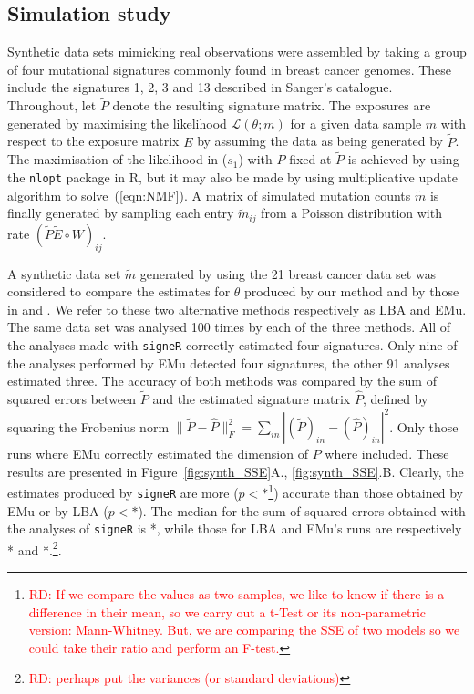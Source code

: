 \documentclass{bioinfo}
\begin{document}
\subsection{Simulation study}
Synthetic data sets mimicking real observations were assembled by
taking a group of four mutational signatures commonly found in breast
cancer genomes. These include the signatures 1, 2, 3 and 13 described
in Sanger's catalogue. Throughout, let $\widetilde P$ denote the
resulting signature matrix.  The exposures are generated by maximising
the likelihood $\mathcal L(\theta; m)$ for a given data sample $m$
with respect to the exposure matrix $E$ by assuming the data as being
generated by $\widetilde P$. The maximisation of the likelihood in
($s_1$) with $P$ fixed at $\widetilde P$ is achieved by using the
\texttt{nlopt} package in R, but it may also be made by using
\cite{LS} multiplicative update algorithm to solve~(\ref{eqn:NMF}). A
matrix of simulated mutation counts $\widetilde m$ is finally
generated by sampling each entry $\widetilde m_{ij}$ from a Poisson
distribution with rate $(\widetilde P\widetilde E\circ W)_{ij}$.

A synthetic data set $\widetilde m$ generated by using the 21 breast
cancer data set was considered to compare the estimates for $\theta$
produced by our method and by those in \cite{A} and \cite{FICMV}. We
refer to these two alternative methods respectively as LBA and EMu.
The same data set was analysed 100 times by each of the three
methods. All of the analyses made with \texttt{signeR} correctly
estimated four signatures. Only nine of the analyses performed by EMu
detected four signatures, the other 91 analyses estimated three.  The
accuracy of both methods was compared by the sum of squared errors
between $\widetilde P$ and the estimated signature matrix $\widehat
P$, defined by squaring the Frobenius norm $\|\widetilde P - \widehat
P\|_F^2 = \sum_{in} |(\widetilde P)_{in} - (\widehat
P)_{in}|^2$. Only those runs where EMu correctly estimated the
dimension of $P$ where included. These results are presented in
Figure~\ref{fig:synth_SSE}A., \ref{fig:synth_SSE}.B. Clearly, the  estimates produced by
\texttt{signeR} are more ($p<*$\footnote{\textcolor{red}{RD: If we
    compare the values as two samples, we like to know if there is a
    difference in their mean, so we carry out a t-Test or its
    non-parametric version: Mann-Whitney. But, we are comparing
    the SSE of two models so we could take their ratio and perform an
    F-test.}}) accurate than those  obtained by EMu  
or by LBA ($p<*$). The median for the sum of squared errors obtained
with the analyses of \texttt{signeR} is *, while those for LBA and
EMu's runs are respectively * and *.\footnote{\textcolor{red}{RD:
perhaps put the variances (or standard deviations)}}.
\end{document}

